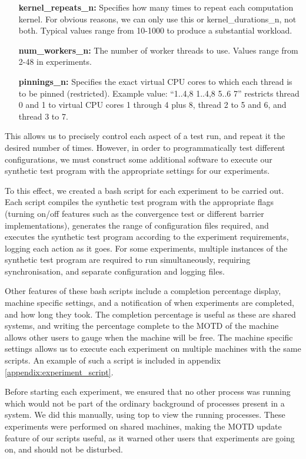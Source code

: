 \begin{itemize}
    \item[\textbf{kernel\_repeats\_n:}]   Specifies how many times to repeat each computation kernel. For obvious reasons, we can only use this or kernel\_durations\_n, not both. Typical values range from 10-1000 to produce a substantial workload.
    
    \item[\textbf{num\_workers\_n:}]      The number of worker threads to use. Values range from 2-48 in experiments.
    
    \item[\textbf{pinnings\_n:}]          Specifies the exact virtual CPU cores to which each thread is to be pinned (restricted).  Example value: ``1..4,8 1..4,8 5..6 7'' restricts thread 0 and 1 to virtual CPU cores 1 through 4 plus 8, thread 2 to 5 and 6, and thread 3 to 7.
\end{itemize}

This allows us to precisely control each aspect of a test run, and repeat it the desired number of times. However, in order to programmatically test different configurations, we must construct some additional software to execute our synthetic test program with the appropriate settings for our experiments.

To this effect, we created a bash script for each experiment to be carried out. Each script compiles the synthetic test program with the appropriate flags (turning on/off features such as the convergence test or different barrier implementations), generates the range of configuration files required, and executes the synthetic test program according to the experiment requirements, logging each action as it goes. For some experiments, multiple instances of the synthetic test program are required to run simultaneously, requiring synchronisation, and separate configuration and logging files.

Other features of these bash scripts include a completion percentage display, machine specific settings, and a notification of when experiments are completed, and how long they took. The completion percentage is useful as these are shared systems, and writing the percentage complete to the MOTD of the machine allows other users to gauge when the machine will be free. The machine specific settings allows us to execute each experiment on multiple machines with the same scripts. An example of such a script is included in appendix \ref{appendix:experiment_script}.

Before starting each experiment, we ensured that no other process was running which would not be part of the ordinary background of processes present in a system. We did this manually, using top to view the running processes. These experiments were performed on shared machines, making the MOTD update feature of our scripts useful, as it warned other users that experiments are going on, and should not be disturbed.



